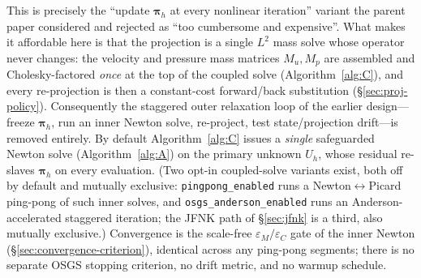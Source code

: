 \documentclass{article}
\newcommand{\code}[1]{\texttt{\small #1}}
\begin{document}
This is precisely the ``update $\boldsymbol{\pi}_h$ at every nonlinear
iteration'' variant the parent paper considered and rejected as ``too
cumbersome and expensive''. What makes it affordable here is that the
projection is a single $L^2$ mass solve whose operator never changes:
the velocity and pressure mass matrices $M_u, M_p$ are assembled and
Cholesky-factored \emph{once} at the top of the coupled solve (Algorithm~\ref{alg:C}), and every
re-projection is then a constant-cost forward/back substitution
(§\ref{sec:proj-policy}). Consequently the staggered outer relaxation
loop of the earlier design---freeze $\boldsymbol{\pi}_h$, run an inner
Newton solve, re-project, test state/projection drift---is removed
entirely. By default Algorithm~\ref{alg:C} issues a \emph{single}
safeguarded Newton solve (Algorithm~\ref{alg:A}) on the primary unknown
$U_h$, whose residual re-slaves $\boldsymbol{\pi}_h$ on every evaluation.
(Two opt-in coupled-solve variants exist, both off by default and mutually
exclusive: \code{pingpong\_enabled} runs a Newton$\leftrightarrow$Picard
ping-pong of such inner solves, and \code{osgs\_anderson\_enabled} runs an
Anderson-accelerated staggered iteration; the JFNK path of §\ref{sec:jfnk}
is a third, also mutually exclusive.) Convergence is the scale-free
$\varepsilon_M/\varepsilon_C$ gate of the inner Newton
(§\ref{sec:convergence-criterion}), identical across any ping-pong
segments; there is no separate OSGS stopping criterion, no drift metric,
and no warmup schedule.
\end{document}

